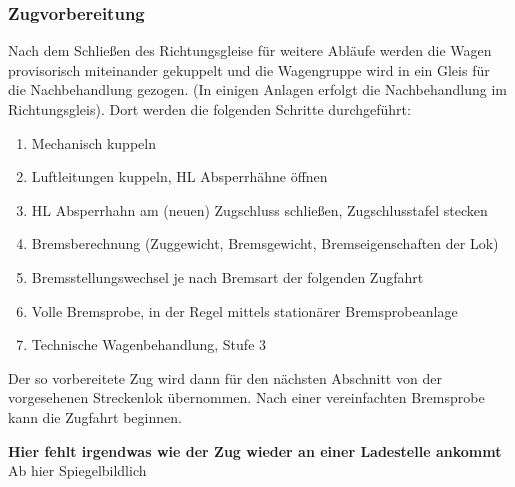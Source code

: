 \subsubsection{Zugvorbereitung}\label{sec:Zugvorbereitung}
Nach dem Schließen des Richtungsgleise für weitere Abläufe werden die Wagen provisorisch miteinander gekuppelt und die Wagengruppe wird in ein Gleis für die Nachbehandlung gezogen. (In einigen Anlagen erfolgt die Nachbehandlung im Richtungsgleis). Dort werden die folgenden Schritte durchgeführt:
\begin{enumerate}
    \item Mechanisch kuppeln
    \item Luftleitungen kuppeln, HL Absperrhähne öffnen
    \item HL Absperrhahn am (neuen) Zugschluss schließen, Zugschlusstafel stecken
    \item Bremsberechnung (Zuggewicht, Bremsgewicht, Bremseigenschaften der Lok)
    \item Bremsstellungswechsel je nach Bremsart der folgenden Zugfahrt
    \item Volle Bremsprobe, in der Regel mittels stationärer Bremsprobeanlage
    \item Technische Wagenbehandlung, Stufe 3
\end{enumerate}
Der so vorbereitete Zug wird dann für den nächsten Abschnitt von der vorgesehenen Streckenlok übernommen. Nach einer vereinfachten Bremsprobe kann die Zugfahrt beginnen.\par
\textbf{Hier fehlt irgendwas wie der Zug wieder an einer Ladestelle ankommt}\\
Ab hier Spiegelbildlich
